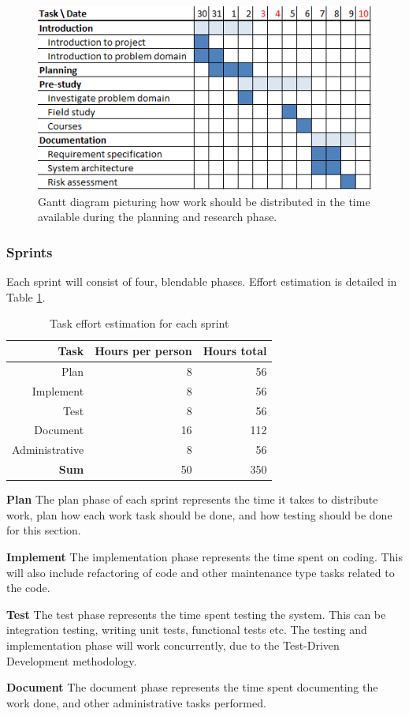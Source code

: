 \begin{figure}[h]
\centering
  \includegraphics{project_management/pre_implementation_gantt}
  \caption[Gantt chart of planning and research phase]{Gantt diagram picturing how work should be distributed in the time available during the planning and research phase.}
  \label{gantt:pre_imp}
\end{figure}



\subsubsection{Sprints}
Each sprint will consist of four, blendable phases. Effort estimation is detailed in Table \ref{Sprint effort estimation}.
\begin{table}[htbp]
\begin{center}
  \begin{tabular}{|r|r|r|}
    \hline
    \bf{Task} & \bf{Hours per person} & \bf{Hours total} \\
    \hline
    Plan & 8 & 56 \\
    Implement & 8 & 56 \\
    Test & 8 & 56 \\
    Document & 16 & 112 \\
    Administrative & 8 & 56 \\
    \hline \hline
    \bf{Sum} & 50 & 350 \\
    \hline
  \end{tabular}
  \caption{Task effort estimation for each sprint}
  \label{Sprint effort estimation}
\end{center}
\end{table}

\textbf{Plan} The plan phase of each sprint represents the time it takes to distribute work, plan how each work task should be done, and how testing should be done for this section.

\textbf{Implement} The implementation phase represents the time spent on coding. This will also include refactoring of code and other maintenance type tasks related to the code.

\textbf{Test} The test phase represents the time spent testing the system. This can be integration testing, writing unit tests, functional tests etc. The testing and implementation phase will work concurrently, due to the Test-Driven Development methodology.

\textbf{Document} The document phase represents the time spent documenting the work done, and other administrative tasks performed.


